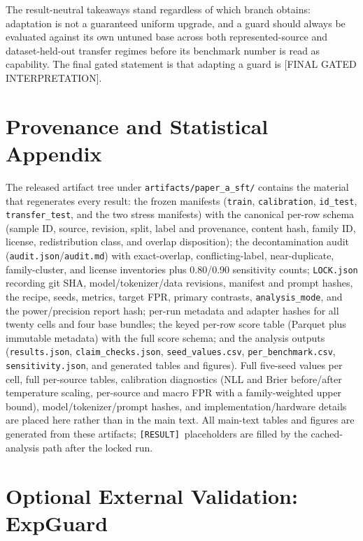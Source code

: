 \documentclass[sigconf,nonacm]{acmart}
\newcommand{\RES}{\texttt{[RESULT]}}
\begin{document}
The result-neutral takeaways stand regardless of which branch obtains: adaptation is not a guaranteed uniform upgrade, and a guard should always be evaluated against its own untuned base across both represented-source and dataset-held-out transfer regimes before its benchmark number is read as capability. The final gated statement is that adapting a guard is [FINAL GATED INTERPRETATION].

\appendix

\section{Provenance and Statistical Appendix}
\label{app:provenance}

The released artifact tree under \texttt{artifacts/paper\_a\_sft/} contains the material that regenerates every result: the frozen manifests (\texttt{train}, \texttt{calibration}, \texttt{id\_test}, \texttt{transfer\_test}, and the two stress manifests) with the canonical per-row schema (sample ID, source, revision, split, label and provenance, content hash, family ID, license, redistribution class, and overlap disposition); the decontamination audit (\texttt{audit.json}/\texttt{audit.md}) with exact-overlap, conflicting-label, near-duplicate, family-cluster, and license inventories plus 0.80/0.90 sensitivity counts; \texttt{LOCK.json} recording git SHA, model/tokenizer/data revisions, manifest and prompt hashes, the recipe, seeds, metrics, target FPR, primary contrasts, \texttt{analysis\_mode}, and the power/precision report hash; per-run metadata and adapter hashes for all twenty cells and four base bundles; the keyed per-row score table (Parquet plus immutable metadata) with the full score schema; and the analysis outputs (\texttt{results.json}, \texttt{claim\_checks.json}, \texttt{seed\_values.csv}, \texttt{per\_benchmark.csv}, \texttt{sensitivity.json}, and generated tables and figures). Full five-seed values per cell, full per-source tables, calibration diagnostics (NLL and Brier before/after temperature scaling, per-source and macro FPR with a family-weighted upper bound), model/tokenizer/prompt hashes, and implementation/hardware details are placed here rather than in the main text. All main-text tables and figures are generated from these artifacts; \RES\ placeholders are filled by the cached-analysis path after the locked run.

\section{Optional External Validation: ExpGuard}
\label{app:external}
\end{document}
